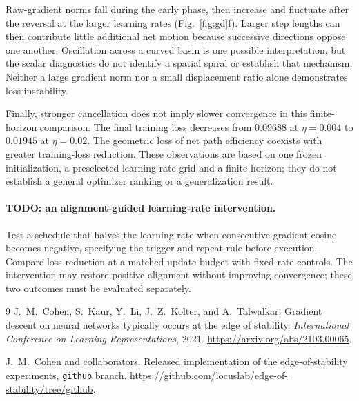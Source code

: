 \documentclass[11pt]{article}
\begin{document}
Raw-gradient norms fall during the early phase, then increase and fluctuate
after the reversal at the larger learning rates (Fig.~\ref{fig:gd}f).
Larger step lengths can then contribute little additional net motion because
successive directions oppose one another. Oscillation across a curved basin is
one possible interpretation, but the scalar diagnostics do not identify a
spatial spiral or establish that mechanism. Neither a large gradient norm nor
a small displacement ratio alone demonstrates loss instability.

Finally, stronger cancellation does not imply slower convergence in this
finite-horizon comparison. The final training loss decreases from $0.09688$ at
$\eta=0.004$ to $0.01945$ at $\eta=0.02$. The geometric loss of net path
efficiency coexists with greater training-loss reduction. These observations
are based on one frozen initialization, a preselected learning-rate grid and
a finite horizon; they do not establish a general optimizer ranking or a
generalization result.

\paragraph{TODO: an alignment-guided learning-rate intervention.}
Test a schedule that halves the learning rate when consecutive-gradient cosine
becomes negative, specifying the trigger and repeat rule before execution.
Compare loss reduction at a matched update budget with fixed-rate controls.
The intervention may restore positive alignment without improving convergence;
these two outcomes must be evaluated separately.

\begin{thebibliography}{9}
J.~M.~Cohen, S.~Kaur, Y.~Li, J.~Z.~Kolter, and A.~Talwalkar.
\newblock Gradient descent on neural networks typically occurs at the edge of
stability.
\newblock \emph{International Conference on Learning Representations}, 2021.
\newblock \url{https://arxiv.org/abs/2103.00065}.

J.~M.~Cohen and collaborators.
\newblock Released implementation of the edge-of-stability experiments,
\texttt{github} branch.
\newblock \url{https://github.com/locuslab/edge-of-stability/tree/github}.
\end{thebibliography}
\end{document}
